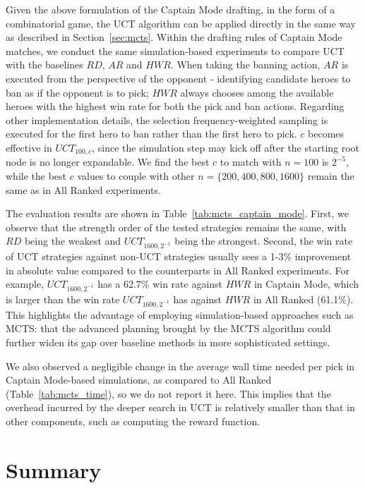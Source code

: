 Given the above formulation of the Captain Mode drafting, in the form of a combinatorial game, the UCT algorithm can be applied directly in the same way as described in Section~\ref{sec:mcts}. Within the drafting rules of Captain Mode matches, we conduct the same simulation-based experiments to compare UCT with the baselines $RD$, $AR$ and $HWR$. When taking the banning action, $AR$ is executed from the perspective of the opponent - identifying candidate heroes to ban as if the opponent is to pick; $HWR$ always chooses among the available heroes with the highest win rate for both the pick and ban actions. Regarding other implementation details, the selection frequency-weighted sampling is executed for the first hero to ban rather than the first hero to pick. $c$ becomes effective in $UCT_{100, c}$, since the simulation step may kick off after the starting root node is no longer expandable. We find the best $c$ to match with ${n=100}$ is $2^{-5}$, while the best $c$ values to couple with other ${n=\{200, 400, 800, 1600\}}$ remain the same as in All Ranked experiments.

The evaluation results are shown in Table~\ref{tab:mcts_captain_mode}. First, we observe that the strength order of the tested strategies remains the same, with $RD$ being the weakest and $UCT_{1600, 2^{-1}}$ being the strongest. Second, the win rate of UCT strategies against non-UCT strategies usually sees a 1-3\%  improvement in absolute value compared to the counterparts in All Ranked experiments. For example, $UCT_{1600, 2^{-1}}$ has a 62.7\% win rate against $HWR$ in Captain Mode, which is larger than the win rate $UCT_{1600, 2^{-1}}$ has against $HWR$ in All Ranked (61.1\%). This highlights the advantage of employing simulation-based approaches such as MCTS: that the advanced planning brought by the MCTS algorithm could further widen its gap over baseline methods in more sophisticated settings.

We also observed a negligible change in the average wall time needed per pick in Captain Mode-based simulations, as compared to All Ranked (Table~\ref{tab:mcts_time}), so we do not report it here. This implies that the overhead incurred by the deeper search in UCT is relatively smaller than that in other components, such as computing the reward function. 


\section{Summary}


